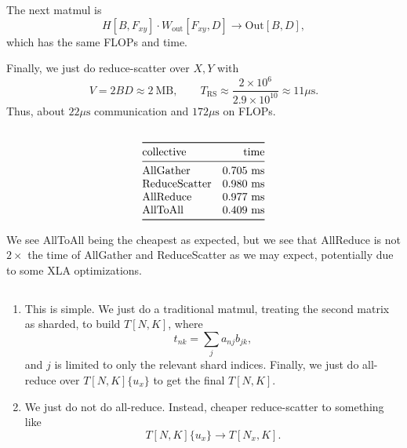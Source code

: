 \documentclass[11pt]{article}
\newcommand{\B}{B}
\newcommand{\D}{D}
\newcommand{\us}{\mu\mathrm{s}}
\newcommand{\ms}{\mathrm{ms}}
\newcommand{\exercisebreak}{\Needspace{8\baselineskip}}
\begin{document}
The next matmul is
\[
  H[B,F_{xy}]\cdot W_{\mathrm{out}}[F_{xy},D]\to \mathrm{Out}[B,D],
\]
which has the same FLOPs and time.

Finally, we just do reduce-scatter over $X,Y$ with
\[
  V=2\B\D\approx 2\ \mathrm{MB},
  \qquad
  T_{\mathrm{RS}}\approx \frac{2\times 10^6}{2.9\times 10^{10}}\approx 11\us.
\]
Thus, about $22\us$ communication and $172\us$ on FLOPs.

\exercisebreak
\subsection{}
\[
\begin{array}{@{}lr@{}}
\toprule
\text{collective} & \text{time} \\
\midrule
\text{AllGather} & 0.705\ \ms \\
\text{ReduceScatter} & 0.980\ \ms \\
\text{AllReduce} & 0.977\ \ms \\
\text{AllToAll} & 0.409\ \ms \\
\bottomrule
\end{array}
\]

We see AllToAll being the cheapest as expected, but we see that AllReduce is not $2\times$ the time of AllGather and ReduceScatter as we may expect, potentially due to some XLA optimizations.

\exercisebreak
\subsection{}
\begin{enumerate}
  \item This is simple. We just do a traditional matmul, treating the second matrix as sharded, to build $T[N,K]$, where
  \[
    t_{nk}=\sum_j a_{nj}b_{jk},
  \]
  and $j$ is limited to only the relevant shard indices. Finally, we just do all-reduce over $T[N,K]\{u_x\}$ to get the final $T[N,K]$.

  \item We just do not do all-reduce. Instead, cheaper reduce-scatter to something like
  \[
    T[N,K]\{u_x\}\to T[N_x,K].
  \]
\end{enumerate}

\exercisebreak
\end{document}
